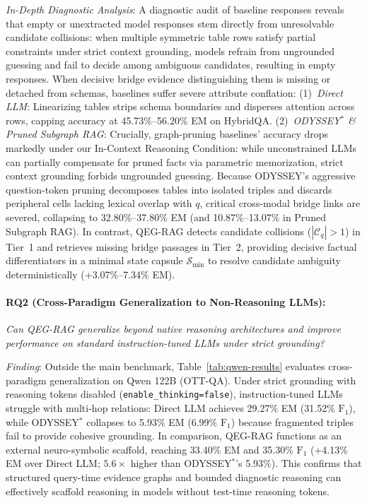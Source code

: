 \documentclass[runningheads]{llncs}
\begin{document}
\emph{In-Depth Diagnostic Analysis}: A diagnostic audit of baseline responses reveals that empty or unextracted model responses stem directly from unresolvable candidate collisions: when multiple symmetric table rows satisfy partial constraints under strict context grounding, models refrain from ungrounded guessing and fail to decide among ambiguous candidates, resulting in empty responses. When decisive bridge evidence distinguishing them is missing or detached from schemas, baselines suffer severe attribute conflation: (1)~\emph{Direct LLM}: Linearizing tables strips schema boundaries and disperses attention across rows, capping accuracy at 45.73\%--56.20\% EM on HybridQA. (2)~\emph{ODYSSEY$^*$ \& Pruned Subgraph RAG}: Crucially, graph-pruning baselines' accuracy drops markedly under our In-Context Reasoning Condition: while unconstrained LLMs can partially compensate for pruned facts via parametric memorization, strict context grounding forbids ungrounded guessing. Because ODYSSEY's aggressive question-token pruning decomposes tables into isolated triples and discards peripheral cells lacking lexical overlap with $q$, critical cross-modal bridge links are severed, collapsing to 32.80\%--37.80\% EM (and 10.87\%--13.07\% in Pruned Subgraph RAG). In contrast, QEG-RAG detects candidate collisions ($|\mathcal{C}_q| > 1$) in Tier~1 and retrieves missing bridge passages in Tier~2, providing decisive factual differentiators in a minimal state capsule $\mathcal{S}_{\min}$ to resolve candidate ambiguity deterministically (+3.07\%--7.34\% EM).

\paragraph{RQ2 (Cross-Paradigm Generalization to Non-Reasoning LLMs):}
\emph{Can QEG-RAG generalize beyond native reasoning architectures and improve performance on standard instruction-tuned LLMs under strict grounding?}

\emph{Finding}: Outside the main benchmark, Table~\ref{tab:qwen-results} evaluates cross-paradigm generalization on Qwen 122B (OTT-QA). Under strict grounding with reasoning tokens disabled (\texttt{enable\_thinking=false}), instruction-tuned LLMs struggle with multi-hop relations: Direct LLM achieves 29.27\% EM (31.52\% $\text{F}_1$), while ODYSSEY$^*$ collapses to 5.93\% EM (6.99\% $\text{F}_1$) because fragmented triples fail to provide cohesive grounding. In comparison, QEG-RAG functions as an external neuro-symbolic scaffold, reaching 33.40\% EM and 35.30\% $\text{F}_1$ (+4.13\% EM over Direct LLM; $5.6\times$ higher than ODYSSEY$^*$'s 5.93\%). This confirms that structured query-time evidence graphs and bounded diagnostic reasoning can effectively scaffold reasoning in models without test-time reasoning tokens.
\end{document}
